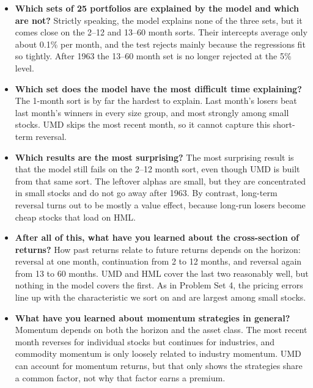 \documentclass[11pt]{article}
\begin{document}
\begin{itemize}
\setlength{\itemsep}{4pt}\setlength{\parskip}{0pt}

\item \textbf{Which sets of 25 portfolios are explained by the model and which are not?} Strictly speaking, the model explains none of the three sets, but it comes close on the 2--12 and 13--60 month sorts. Their intercepts average only about 0.1\% per month, and the test rejects mainly because the regressions fit so tightly. After 1963 the 13--60 month set is no longer rejected at the 5\% level.

\item \textbf{Which set does the model have the most difficult time explaining?} The 1-month sort is by far the hardest to explain. Last month's losers beat last month's winners in every size group, and most strongly among small stocks. UMD skips the most recent month, so it cannot capture this short-term reversal.

\item \textbf{Which results are the most surprising?} The most surprising result is that the model still fails on the 2--12 month sort, even though UMD is built from that same sort. The leftover alphas are small, but they are concentrated in small stocks and do not go away after 1963. By contrast, long-term reversal turns out to be mostly a value effect, because long-run losers become cheap stocks that load on HML.

\item \textbf{After all of this, what have you learned about the cross-section of returns?} How past returns relate to future returns depends on the horizon: reversal at one month, continuation from 2 to 12 months, and reversal again from 13 to 60 months. UMD and HML cover the last two reasonably well, but nothing in the model covers the first. As in Problem Set 4, the pricing errors line up with the characteristic we sort on and are largest among small stocks.

\item \textbf{What have you learned about momentum strategies in general?} Momentum depends on both the horizon and the asset class. The most recent month reverses for individual stocks but continues for industries, and commodity momentum is only loosely related to industry momentum. UMD can account for momentum returns, but that only shows the strategies share a common factor, not why that factor earns a premium.

\end{itemize}
\end{document}
